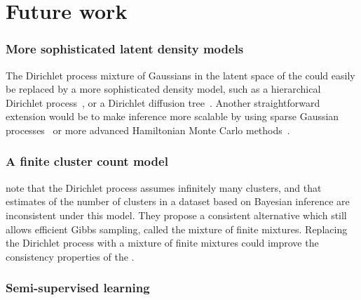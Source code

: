 

\section{Future work}


\subsubsection{More sophisticated latent density models}
The Dirichlet process mixture of Gaussians in the latent space of the \iwmm{} could easily be replaced by a more sophisticated density model, such as a hierarchical Dirichlet process~\citep{teh2006hierarchical}, or a Dirichlet diffusion tree~\citep{neal2003density}.
Another straightforward extension would be to make inference more scalable by using sparse Gaussian processes~\citep{quinonero2005unifying,snelson2006sparse} or more advanced Hamiltonian Monte Carlo methods~\citep{zhang2011quasi}.


\subsubsection{A finite cluster count model}
\citet{miller2013inconsistent} note that the Dirichlet process assumes infinitely many clusters, and that estimates of the number of clusters in a dataset based on Bayesian inference are inconsistent under this model.
They propose a consistent alternative which still allows efficient Gibbs sampling, called the mixture of finite mixtures.
Replacing the Dirichlet process with a mixture of finite mixtures could improve the consistency properties of the \iwmm{}.




\subsubsection{Semi-supervised learning}


